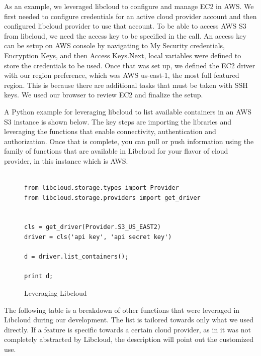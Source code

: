 As an example, we leveraged libcloud to configure and manage EC2 in AWS. We
first needed to configure credentials for an active cloud provider account and
then configured libcloud provider to use that account. To be able to access AWS
S3 from libcloud, we need the access key to be specified in the call. An access
key can be setup on AWS console by navigating to My Security credentials,
Encryption Keys, and then Access Keys.Next, local variables were defined to
store the credentials to be used. Once that was set up, we defined the EC2 
driver with our region preference, which was AWS us-east-1, the most full
featured region. This is because there are additional tasks that must be taken
with SSH keys. We used our browser to review EC2 and finalize the setup.

A Python example for leveraging libcloud to list available containers in an AWS
S3 instance is shown below. The key steps are importing the libraries and
leveraging the functions that enable connectivity, authentication and
authorization. Once that is complete, you can pull or push information using the
family of functions that are available in Libcloud for your flavor of cloud
provider, in this instance which is AWS.



\begin{figure}[htb]

\begin{verbatim}

from libcloud.storage.types import Provider
from libcloud.storage.providers import get_driver


cls = get_driver(Provider.S3_US_EAST2)
driver = cls('api key', 'api secret key')

d = driver.list_containers();

print d;

\end{verbatim}

\caption{Leveraging Libcloud
\cite{hid-sp18-518-LibCloud}}\label{c:libcloud-example}

\end{figure}

The following table is a breakdown of other functions that were leveraged in
Libcloud during our development. The list is tailored towards only what we used
directly. If a feature is specific towards a certain cloud provider, as in it
was not completely abstracted by Libcloud, the description will point out the
customized use.
 
